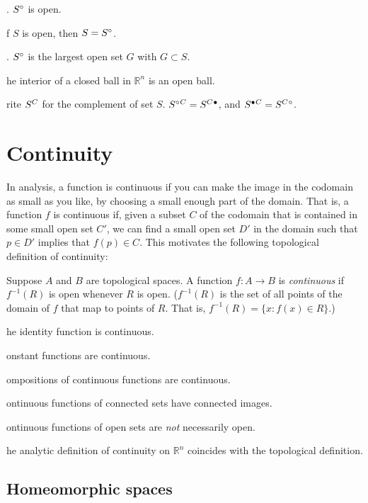 \documentclass{article}
\def\R{{\mathbb R}}
\def\Rn{{\R^n}}
\newcounter{exercisecounter}\setcounter{exercisecounter}{1}
\def\Exercise.#1\par{{\item\small \makebox{\bf Exercise \number\theexercisecounter.\hspace{0.5em}}\unskip\ignorespaces#1\addtocounter{exercisecounter}{1}}}
\def\comp#1{\smash{#1}^C\vphantom{#1}}
\def\inter#1{\smash{#1}^\circ\vphantom{#1}}
\def\clos#1{\smash{#1}^\bullet\vphantom{#1}}
\def\closcomp#1{\clos{\comp{#1}}}
\def\compclos#1{\comp{\clos{#1}}}
\def\intercomp#1{\inter{\comp{#1}}}
\def\compinter#1{\comp{\inter{#1}}}
\begin{document}
\begin{itemize}
\Exercise. $\inter S$ is open.

\Exercise. If $S$ is open, then $S = \inter S$.

\Exercise. $\inter S$ is the largest open set $G$ with $G\subset S$.

\Exercise. The interior of a closed ball in $\Rn$ is an open ball.  

\Exercise. Write $\comp S$ for the complement of set $S$.  $\compinter S = \closcomp S$, and
$\compclos S = \intercomp S$.

\end{itemize}

\section*{Continuity}

In analysis, a function is continuous if you can make the image in the
codomain as small as you like, by choosing a small enough part of the
domain.  That is, a function $f$ is continuous if, given a subset $C$
of the codomain that is contained in some small open set $C'$, we can
find a small open set $D'$ in the domain such that $p\in D'$ implies
that $f(p)\in C$.  This motivates the following topological definition
of continuity:

Suppose $A$ and $B$ are topological spaces.  A function $f : A\to B$
is {\em continuous\/} if $f^{-1}(R)$ is open whenever $R$ is open.
($f^{-1}(R)$ is the set of all points of the domain of $f$ that map to
points of $R$.  That is, $f^{-1}(R) = \{ x : f(x)\in R \}$.)

\begin{itemize}
\Exercise. The identity function is continuous.

\Exercise. Constant functions are continuous.

\Exercise. Compositions of continuous functions are continuous.

\Exercise. Continuous functions of connected sets have connected images.

\Exercise. Continuous functions of open sets are {\em not\/} necessarily open.

\Exercise. The analytic definition of continuity on $\Rn$ coincides with the
topological definition.

\end{itemize}

\subsection*{Homeomorphic spaces}
\end{document}
